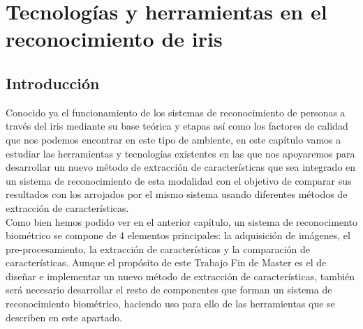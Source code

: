 
\chapter{Tecnologías y herramientas en el reconocimiento de iris} %

\label{Capítulo 3} %




\section{Introducción}

Conocido ya el funcionamiento de los sistemas de reconocimiento de personas a través del iris mediante su base teórica y etapas así como los factores de calidad que nos podemos encontrar en este tipo de ambiente, en este capítulo vamos a estudiar las herramientas y tecnologías existentes en las que nos apoyaremos para desarrollar un nuevo método de extracción de características que sea integrado en un sistema de reconocimiento de esta modalidad con el objetivo de comparar sus resultados con los arrojados por el mismo sistema usando diferentes métodos de extracción de características. \\

Como bien hemos podido ver en el anterior capítulo, un sistema de reconocimento biométrico se compone de 4 elementos principales: la adquisición de imágenes, el pre-procesamiento, la extracción de características y la comparación de características. Aunque el propósito de este Trabajo Fin de Master es el de diseñar e implementar un nuevo método de extracción de características, también será necesario desarrollar el resto de componentes que forman un sistema de reconocimiento biométrico, haciendo uso para ello de las herramientas que se describen en este apartado.\\ 

